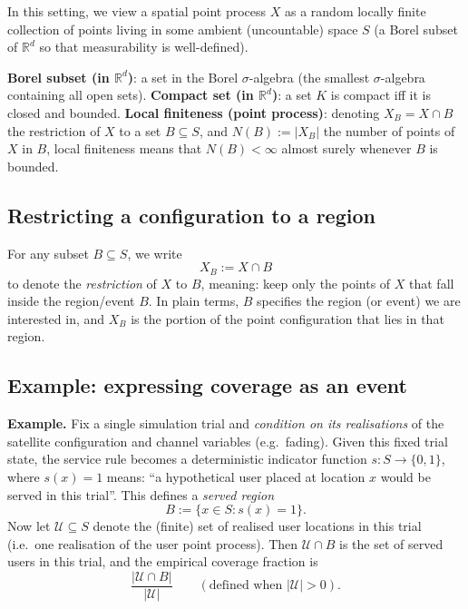 In this setting, we view a spatial point process $X$ as a random locally finite collection of points living in some ambient (uncountable) space
$S$ (a Borel subset of $\mathbb{R}^d$ so that measurability is well-defined).


\noindent\textbf{Borel subset (in $\mathbb{R}^d$)}: a set in the Borel $\sigma$-algebra (the smallest $\sigma$-algebra containing all open sets).
\newline\textbf{Compact set (in $\mathbb{R}^d$)}: a set $K$ is compact iff it is closed and bounded.
\newline\textbf{Local finiteness (point process)}: denoting $X_B = X\cap B$ the restriction of $X$ to a set $B\subseteq S$, and
$N(B):=\lvert X_B\rvert$ the number of points of $X$ in $B$, local finiteness means that $N(B)<\infty$ almost surely whenever $B$ is bounded.

\subsection{Restricting a configuration to a region}

For any subset $B \subseteq S$,
we write
$$
X_B := X \cap B
$$
to denote the \emph{restriction} of $X$ to $B$, meaning: keep only the points of $X$ that fall inside the region/event $B$.
In plain terms, $B$ specifies the region (or event) we are interested in, and $X_B$ is the portion of the point configuration
that lies in that region.

\subsection{Example: expressing coverage as an event}

\noindent\textbf{Example.}
Fix a single simulation trial and \emph{condition on its realisations} of the satellite configuration and channel variables
(e.g.\ fading). Given this fixed trial state, the service rule becomes a deterministic indicator function
$s:S\to\{0,1\}$, where $s(x)=1$ means: ``a hypothetical user placed at location $x$ would be served in this trial''.
This defines a \emph{served region}
$$
B := \{x\in S : s(x)=1\}.
$$
Now let $\mathcal{U}\subseteq S$ denote the (finite) set of realised user locations in this trial (i.e.\ one realisation of the
user point process). Then $\mathcal{U}\cap B$ is the set of served users in this trial, and the empirical coverage fraction is
$$
\frac{|\mathcal{U}\cap B|}{|\mathcal{U}|}\qquad (\text{defined when }|\mathcal{U}|>0).
$$

